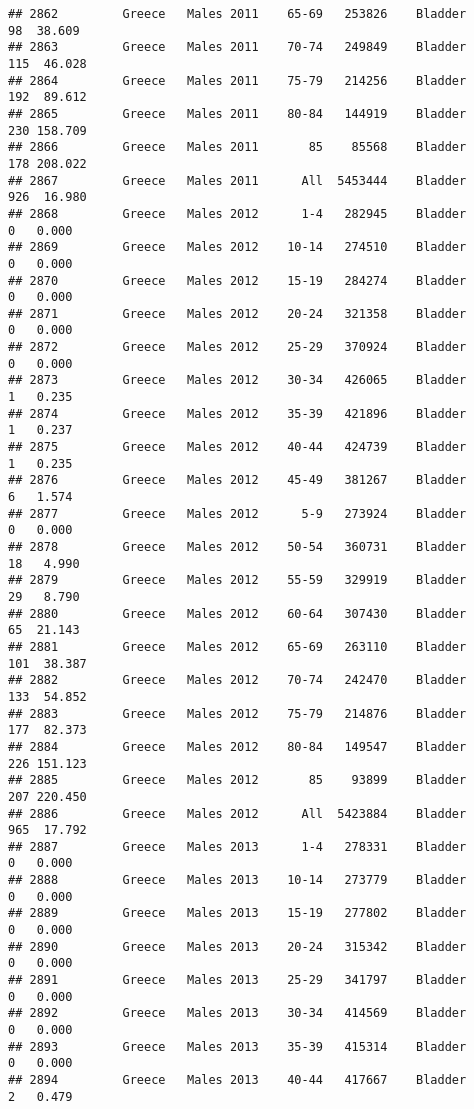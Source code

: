 \documentclass[
]{article}
\begin{document}
\begin{verbatim}
## 2862         Greece   Males 2011    65-69   253826    Bladder     98  38.609
## 2863         Greece   Males 2011    70-74   249849    Bladder    115  46.028
## 2864         Greece   Males 2011    75-79   214256    Bladder    192  89.612
## 2865         Greece   Males 2011    80-84   144919    Bladder    230 158.709
## 2866         Greece   Males 2011       85    85568    Bladder    178 208.022
## 2867         Greece   Males 2011      All  5453444    Bladder    926  16.980
## 2868         Greece   Males 2012      1-4   282945    Bladder      0   0.000
## 2869         Greece   Males 2012    10-14   274510    Bladder      0   0.000
## 2870         Greece   Males 2012    15-19   284274    Bladder      0   0.000
## 2871         Greece   Males 2012    20-24   321358    Bladder      0   0.000
## 2872         Greece   Males 2012    25-29   370924    Bladder      0   0.000
## 2873         Greece   Males 2012    30-34   426065    Bladder      1   0.235
## 2874         Greece   Males 2012    35-39   421896    Bladder      1   0.237
## 2875         Greece   Males 2012    40-44   424739    Bladder      1   0.235
## 2876         Greece   Males 2012    45-49   381267    Bladder      6   1.574
## 2877         Greece   Males 2012      5-9   273924    Bladder      0   0.000
## 2878         Greece   Males 2012    50-54   360731    Bladder     18   4.990
## 2879         Greece   Males 2012    55-59   329919    Bladder     29   8.790
## 2880         Greece   Males 2012    60-64   307430    Bladder     65  21.143
## 2881         Greece   Males 2012    65-69   263110    Bladder    101  38.387
## 2882         Greece   Males 2012    70-74   242470    Bladder    133  54.852
## 2883         Greece   Males 2012    75-79   214876    Bladder    177  82.373
## 2884         Greece   Males 2012    80-84   149547    Bladder    226 151.123
## 2885         Greece   Males 2012       85    93899    Bladder    207 220.450
## 2886         Greece   Males 2012      All  5423884    Bladder    965  17.792
## 2887         Greece   Males 2013      1-4   278331    Bladder      0   0.000
## 2888         Greece   Males 2013    10-14   273779    Bladder      0   0.000
## 2889         Greece   Males 2013    15-19   277802    Bladder      0   0.000
## 2890         Greece   Males 2013    20-24   315342    Bladder      0   0.000
## 2891         Greece   Males 2013    25-29   341797    Bladder      0   0.000
## 2892         Greece   Males 2013    30-34   414569    Bladder      0   0.000
## 2893         Greece   Males 2013    35-39   415314    Bladder      0   0.000
## 2894         Greece   Males 2013    40-44   417667    Bladder      2   0.479

\end{verbatim}
\end{document}
